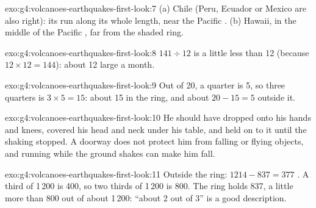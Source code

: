 \begin{solution}{exo:g4:volcanoes-earthquakes-first-look:7}
(a) Chile (Peru, Ecuador or Mexico are also right): its  run along
its whole length, near the Pacific . (b) Hawaii, in the middle of the
Pacific , far from the shaded ring.
\end{solution}

\begin{solution}{exo:g4:volcanoes-earthquakes-first-look:8}
$141 \div 12$ is a little less than 12 (because $12 \times 12 = 144$): about
12 large  a month.
\end{solution}

\begin{solution}{exo:g4:volcanoes-earthquakes-first-look:9}
Out of 20, a quarter is 5, so three quarters is $3 \times 5 = 15$: about 15
in the ring, and about $20 - 15 = 5$ outside it.
\end{solution}

\begin{solution}{exo:g4:volcanoes-earthquakes-first-look:10}
He should have dropped onto his hands and knees, covered his head and neck
under his table, and held on to it until the shaking stopped. A doorway
does not protect him from falling or flying objects, and running while the
ground shakes can make him fall.
\end{solution}

\begin{solution}{exo:g4:volcanoes-earthquakes-first-look:11}
Outside the ring: $1214 - 837 = 377$ . A third of 1\,200 is 400,
so two thirds of 1\,200 is 800. The ring holds 837, a little more than 800
out of about 1\,200: ``about 2 out of 3'' is a good description.
\end{solution}
